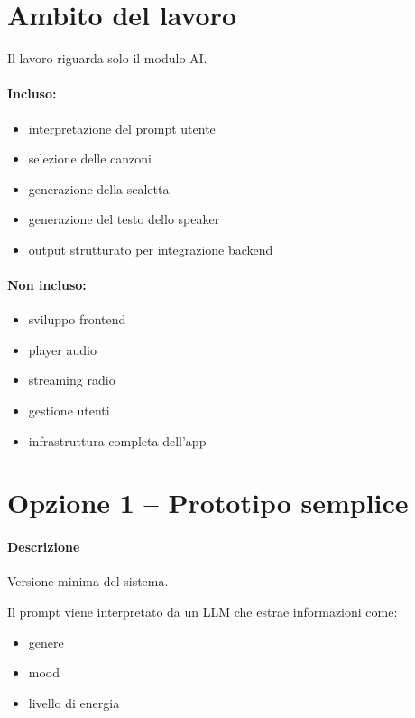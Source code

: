 \documentclass[11pt,a4paper]{article}
\begin{document}
\vspace{0.5cm}
\hrulefill
\vspace{0.5cm}

\section*{Ambito del lavoro}

Il lavoro riguarda solo il modulo AI.

\paragraph{Incluso:}
\begin{itemize}
    \item interpretazione del prompt utente
    \item selezione delle canzoni
    \item generazione della scaletta
    \item generazione del testo dello speaker
    \item output strutturato per integrazione backend
\end{itemize}

\paragraph{Non incluso:}
\begin{itemize}
    \item sviluppo frontend
    \item player audio
    \item streaming radio
    \item gestione utenti
    \item infrastruttura completa dell'app
\end{itemize}

\vspace{0.5cm}
\hrulefill
\vspace{0.5cm}

\section{Opzione 1 -- Prototipo semplice}

\paragraph{Descrizione}
Versione minima del sistema.

Il prompt viene interpretato da un LLM che estrae informazioni come:
\begin{itemize}
    \item genere
    \item mood
    \item livello di energia
\end{itemize}
\end{document}

